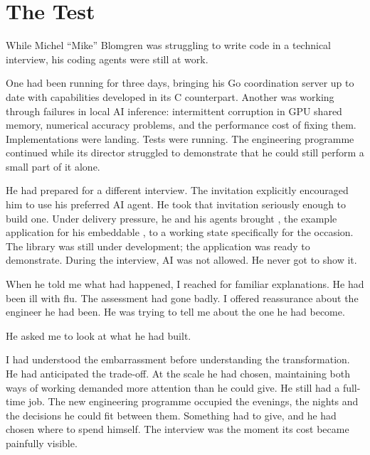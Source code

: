 \section*{The Test}
\begin{EssayColumns}\GutterQuote
\noindent While Michel ``Mike'' Blomgren was struggling to write code in a technical interview, his coding agents were still at work.

One had been running for three days, bringing his Go coordination server up to date with capabilities developed in its C counterpart. Another was working through failures in local AI inference: intermittent corruption in GPU shared memory, numerical accuracy problems, and the performance cost of fixing them. Implementations were landing. Tests were running. The engineering programme continued while its director struggled to demonstrate that he could still perform a small part of it alone.

He had prepared for a different interview. The invitation explicitly encouraged him to use his preferred AI agent. He took that invitation seriously enough to build one. Under delivery pressure, he and his agents brought , the example application for his embeddable , to a working state specifically for the occasion. The library was still under development; the application was ready to demonstrate. During the interview, AI was not allowed. He never got to show it.

When he told me what had happened, I reached for familiar explanations. He had been ill with flu. The assessment had gone badly. I offered reassurance about the engineer he had been. He was trying to tell me about the one he had become.

\NextEssayColumn
{}
\ReserveGutterQuote

He asked me to look at what he had built.

I had understood the embarrassment before understanding the transformation. He had anticipated the trade-off. At the scale he had chosen, maintaining both ways of working demanded more attention than he could give. He still had a full-time job. The new engineering programme occupied the evenings, the nights and the decisions he could fit between them. Something had to give, and he had chosen where to spend himself. The interview was the moment its cost became painfully visible.


\end{EssayColumns}

